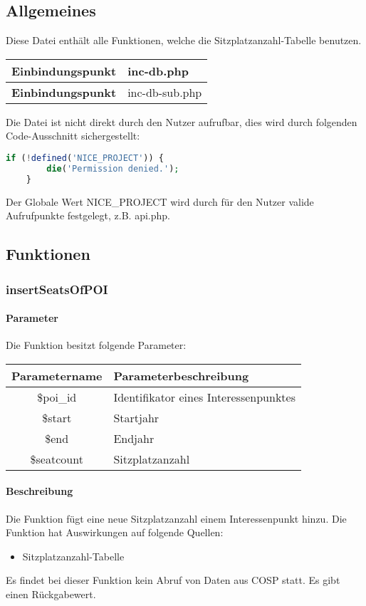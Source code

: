 \subsection{Allgemeines} Diese Datei enthält alle Funktionen, welche die Sitzplatzanzahl-Tabelle benutzen.
\begin{table}[H]
	\begin{tabular}{|c|p{11cm}|}
		\hline
		\textbf{Einbindungspunkt} & inc-db.php \\ \hline
		\textbf{Einbindungspunkt} & inc-db-sub.php \\ \hline
	\end{tabular}
\end{table}
Die Datei ist nicht direkt durch den Nutzer aufrufbar, dies wird durch folgenden Code-Ausschnitt sichergestellt:
\begin{lstlisting}[language=php]
	if (!defined('NICE_PROJECT')) {
		die('Permission denied.');
	}
\end{lstlisting}
Der Globale Wert {\glqq NICE\_PROJECT\grqq} wird durch für den Nutzer valide Aufrufpunkte festgelegt, z.B. {\glqq api.php\grqq}.
\newpage
\subsection{Funktionen}
\subsubsection{insertSeatsOfPOI}
\paragraph{Parameter} Die Funktion besitzt folgende Parameter:
\begin{table}[H]
	\begin{tabular}{|c|p{11cm}|}
		\hline
		\textbf{Parametername} & \textbf{Parameterbeschreibung} \\ \hline
		\$poi\_id   & Identifikator eines Interessenpunktes \\ \hline
		\$start     & Startjahr \\ \hline
		\$end       & Endjahr \\ \hline
		\$seatcount & Sitzplatzanzahl \\ \hline
	\end{tabular}
\end{table}
\paragraph{Beschreibung} Die Funktion fügt eine neue Sitzplatzanzahl einem Interessenpunkt hinzu. Die Funktion hat Auswirkungen auf folgende Quellen:
\begin{itemize}
	\item Sitzplatzanzahl-Tabelle
\end{itemize}
Es findet bei dieser Funktion kein Abruf von Daten aus {\glqq COSP\grqq} statt. Es gibt einen Rückgabewert.
